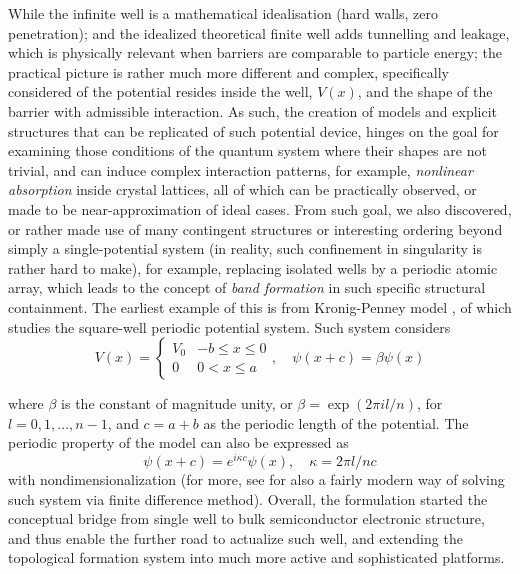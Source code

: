 \documentclass[%
 reprint,
 amsmath,amssymb,
 aps,
]{revtex4-2}
\begin{document}
While the infinite well is a mathematical idealisation (hard walls, zero penetration); and the idealized theoretical finite well adds tunnelling and leakage, which is physically relevant when barriers are comparable to particle energy; the practical picture is rather much more different and complex, specifically considered of the potential resides inside the well, $V(x)$, and the shape of the barrier with admissible interaction. As such, the creation of models and explicit structures that can be replicated of such potential device, hinges on the goal for examining those conditions of the quantum system where their shapes are not trivial, and can induce complex interaction patterns, for example, \textit{nonlinear absorption} inside crystal lattices, all of which can be practically observed, or made to be near-approximation of ideal cases. From such goal, we also discovered, or rather made use of many contingent structures or interesting ordering beyond simply a single-potential system (in reality, such confinement in singularity is rather hard to make), for example, replacing isolated wells by a periodic atomic array, which leads to the concept of \textit{band formation} in such specific structural containment. The earliest example of this is from Kronig-Penney model \cite{10.1098/rspa.1931.0019}, of which studies the square-well periodic potential system. Such system considers
\begin{equation}
    V(x) = \begin{cases}
        V_{0} & -b \leq x \leq 0 \\
        0 & 0 < x \leq a
    \end{cases}
    , \quad 
    \psi(x+c) = \beta\psi(x)
\end{equation}

where $\beta$ is the constant of magnitude unity, or $\beta=\exp{(2\pi i l /n)}$, for $l=0,1,\dots,n-1$, and $c=a+b$ as the periodic length of the potential. The periodic property of the model can also be expressed as
\begin{equation}
    \psi(x+c) = e^{i\kappa c}\psi(x), \quad \kappa = 2\pi l/nc
\end{equation}
with nondimensionalization (for more, see \cite{li2024onedimensionperiodicpotentialsschrodinger} for also a fairly modern way of solving such system via finite difference method). Overall, the formulation started the conceptual bridge from single well to bulk semiconductor electronic structure, and thus enable the further road to actualize such well, and extending the topological formation system into much more active and sophisticated platforms. 
\end{document}
